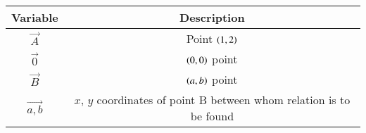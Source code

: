 \begin{tabular}[12pt]{ |c| c|}
    \hline
    \textbf{Variable} & \textbf{Description}\\ 
    \hline
	$\vec{A}$ & Point $\left(1,2\right)$\\
    \hline
	$\vec{0}$ & $\left(0,0\right)$ point\\
    \hline
	$\vec{B}$ & $\left(a,b\right)$ point\\
    \hline
	$\vec{a,b}$ & $x$, $y$ coordinates of point B between whom relation is to be found\\
    \hline
    \end{tabular}
